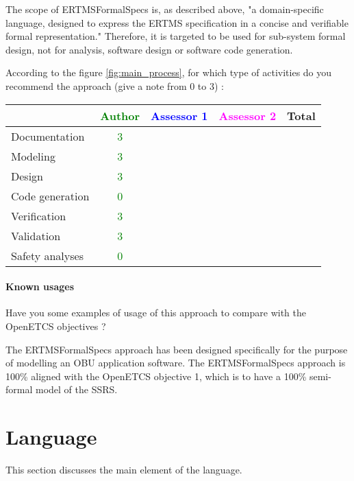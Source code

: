 \begin{author_comment}
The scope of ERTMSFormalSpecs is, as described above, "a domain-specific language, designed to express the ERTMS specification in a concise and verifiable formal representation."
Therefore, it is targeted to be used for sub-system formal design, not for analysis, software design or software code generation.
\end{author_comment}

According to the figure \ref{fig:main_process}, for which type of activities do you recommend the approach (give a note from 0 to  3) :

\begin{tabular}{|l | c | c | c | c|}
\hline
& \textcolor{green}{Author} & \textcolor{blue}{Assessor 1} & \textcolor{magenta}{Assessor 2} & Total \\
\hline 
Documentation & \textcolor{green}{3} & & &  \\
\hline
Modeling & \textcolor{green}{3} & & &  \\
\hline
Design & \textcolor{green}{3} & & & \\
\hline
Code generation & \textcolor{green}{0} & & & \\
\hline
Verification & \textcolor{green}{3} & & & \\
\hline
Validation & \textcolor{green}{3} & & & \\
\hline
Safety analyses & \textcolor{green}{0} & & & \\
\hline
\end{tabular}

\paragraph{Known usages} Have you some examples of usage of this approach to  compare with the OpenETCS objectives ?

\begin{author_comment}
The ERTMSFormalSpecs approach has been designed specifically for the purpose of modelling an OBU application software. The ERTMSFormalSpecs approach is 100\% aligned with the OpenETCS objective 1, which is to have a 100\% semi-formal model of the SSRS. 
\end{author_comment}

\section{Language}
This section discusses the main element of the language.


